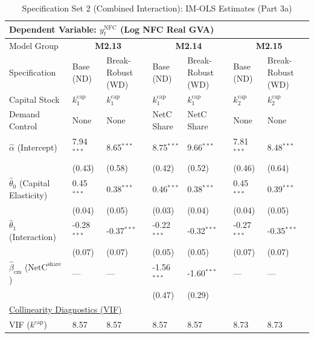 \begin{table}[H]
\centering
\caption{Specification Set 2 (Combined Interaction): IM-OLS Estimates (Part 3a)}
\label{tab:spec_set_2_p3a}
\scriptsize
\begin{tabular}{p{3.8cm}p{2.1cm}p{2.1cm}p{2.1cm}p{2.1cm}p{2.1cm}p{2.1cm}}
\toprule
\multicolumn{7}{l}{\textbf{Dependent Variable: $y_t^{\text{NFC}}$ (Log NFC Real GVA)}} \\
\midrule
Model Group & \multicolumn{2}{c}{\textbf{M2.13}} & \multicolumn{2}{c}{\textbf{M2.14}} & \multicolumn{2}{c}{\textbf{M2.15}}  \\
Specification & Base (ND) & Break-Robust (WD) & Base (ND) & Break-Robust (WD) & Base (ND) & Break-Robust (WD)  \\
Capital Stock & $k^{\text{cap}}_1$ & $k^{\text{cap}}_1$ & $k^{\text{cap}}_1$ & $k^{\text{cap}}_1$ & $k^{\text{cap}}_2$ & $k^{\text{cap}}_2$  \\
Demand Control & None & None & NetC Share & NetC Share & None & None  \\
\midrule
$\hat{\alpha}$ (Intercept)  & 7.94$^{***}$ & 8.65$^{***}$ & 8.75$^{***}$ & 9.66$^{***}$ & 7.81$^{***}$ & 8.48$^{***}$  \\
 & {\scriptsize (0.43)} & {\scriptsize (0.58)} & {\scriptsize (0.42)} & {\scriptsize (0.52)} & {\scriptsize (0.46)} & {\scriptsize (0.64)}  \\
[1ex]
$\hat{\theta}_0$ (Capital Elasticity)  & 0.45$^{***}$ & 0.38$^{***}$ & 0.46$^{***}$ & 0.38$^{***}$ & 0.45$^{***}$ & 0.39$^{***}$  \\
 & {\scriptsize (0.04)} & {\scriptsize (0.05)} & {\scriptsize (0.03)} & {\scriptsize (0.04)} & {\scriptsize (0.04)} & {\scriptsize (0.05)}  \\
$\hat{\theta}_1$ (Interaction)  & -0.28$^{***}$ & -0.37$^{***}$ & -0.22$^{***}$ & -0.32$^{***}$ & -0.27$^{***}$ & -0.35$^{***}$  \\
 & {\scriptsize (0.07)} & {\scriptsize (0.07)} & {\scriptsize (0.05)} & {\scriptsize (0.05)} & {\scriptsize (0.07)} & {\scriptsize (0.07)}  \\
$\hat{\beta}_{\text{cm}}$ ($\text{NetC}^{\text{share}}$)  & --- & --- & -1.56$^{***}$ & -1.60$^{***}$ & --- & ---  \\
 &  &  & {\scriptsize (0.47)} & {\scriptsize (0.29)} &  &   \\
\midrule
\multicolumn{7}{l}{\underline{Collinearity Diagnostics (VIF)}} \\
VIF ($k^{\text{cap}}$) & 8.57 & 8.57 & 8.57 & 8.57 & 8.73 & 8.73  \\

\end{tabular}
\end{table}
